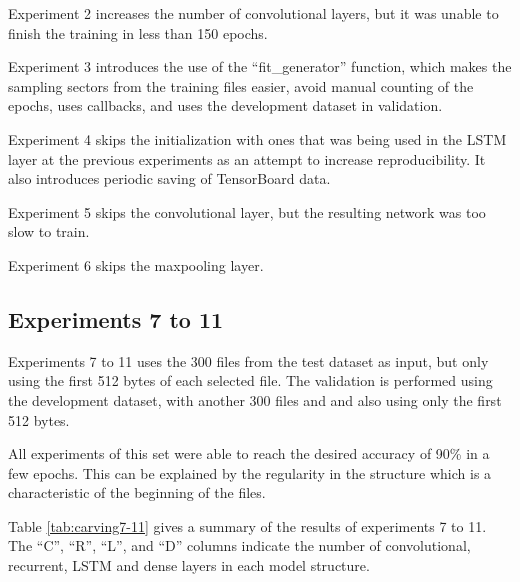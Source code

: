 Experiment 2 increases the number of convolutional layers, but it was unable to finish the training in less than 150 epochs.

Experiment 3 introduces the use of the ``fit\_generator'' function, which makes the sampling sectors from the training files easier, avoid manual counting of the epochs, uses callbacks, and uses the development dataset in validation.

Experiment 4 skips the initialization with ones that was being used in the LSTM layer at the previous experiments as an attempt to increase reproducibility. It also introduces periodic saving of TensorBoard data.

Experiment 5 skips the convolutional layer, but the resulting network was too slow to train.

Experiment 6 skips the maxpooling layer.




\subsection{Experiments 7 to 11}
Experiments 7 to 11 uses the 300 files from the test dataset as input, but only using the first 512 bytes of each selected file. The validation is performed using the development dataset, with another 300 files and and also using only the first 512 bytes.

All experiments of this set were able to reach the desired accuracy of 90\% in a few epochs. This can be explained by the regularity in the structure which is a characteristic of the beginning of the files.

Table \ref{tab:carving7-11} gives a summary of the results of experiments 7 to 11. The ``C'', ``R'', ``L'', and ``D'' columns indicate the number of convolutional, recurrent, LSTM and dense layers in each model structure.


